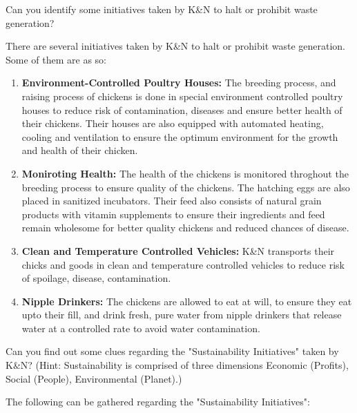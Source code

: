 \documentclass[addpoints]{exam}
\begin{document}
\begin{sloppypar}
\begin{questions}
    \question Can you identify some initiatives taken by K\&N to halt or prohibit waste generation?
    \begin{solution}
        There are several initiatives taken by K\&N to halt or prohibit waste generation. Some of them are as so:
        \begin{enumerate}
            \item \textbf{Environment-Controlled Poultry Houses:} The breeding process, and raising process of chickens is done in special environment controlled poultry houses to reduce risk of contamination, diseases and ensure better health of their chickens. Their houses are also equipped with automated heating, cooling and ventilation to ensure the optimum environment for the growth and health of their chicken.
            \item \textbf{Moniroting Health:} The health of the chickens is monitored throghout the breeding process to ensure quality of the chickens. The hatching eggs are also placed in sanitized incubators. Their feed also consists of natural grain products with vitamin supplements to ensure their ingredients and feed remain wholesome for better quality chickens and reduced chances of disease. 
            \item \textbf{Clean and Temperature Controlled Vehicles:} K\&N transports their chicks and goods in clean and temperature controlled vehicles to reduce risk of spoilage, disease, contamination. 
            \item \textbf{Nipple Drinkers:} The chickens are allowed to eat at will, to ensure they eat upto their fill, and drink fresh, pure water from nipple drinkers that release water at a controlled rate to avoid water contamination. 
        \end{enumerate}
    \end{solution}

    \question Can you find out some clues regarding the "Sustainability Initiatives" taken by K\&N? (Hint: Sustainability is comprised of three dimensions Economic (Profits), Social (People), Environmental (Planet).)
    \begin{solution}
        The following can be gathered regarding the "Sustainability Initiatives":


\end{solution}
\end{questions}
\end{sloppypar}
\end{document}
